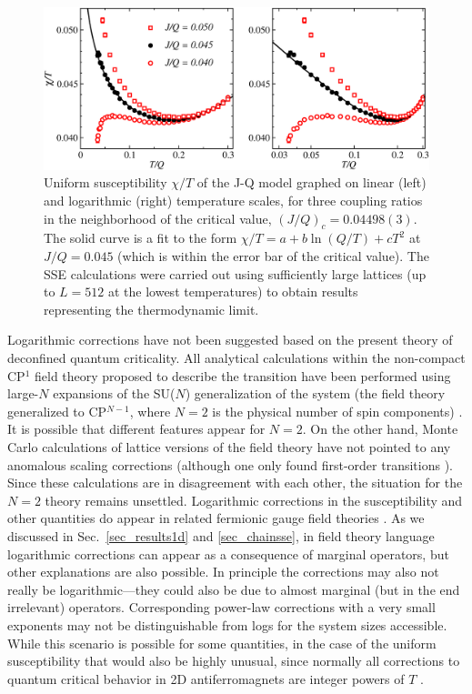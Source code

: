 \documentclass[draft,numberedheadings]{aipproc}
\begin{document}
\begin{figure}
\includegraphics[width=13.5cm, clip]{jqsusc.eps}
\caption{Uniform susceptibility $\chi/T$ of the J-Q model graphed on linear (left) and logarithmic (right) temperature scales, for three coupling ratios 
in the neighborhood of the critical value, $(J/Q)_c = 0.04498(3)$. The solid curve is a fit to the form $\chi/T=a+b\ln(Q/T)+cT^2$ at $J/Q=0.045$
(which is within the error bar of the critical value). The SSE calculations were carried out using sufficiently large lattices (up to $L=512$ 
at the lowest temperatures) to obtain results representing the thermodynamic limit.}
\label{jqsusc}
\end{figure}

Logarithmic corrections have not been suggested based on the present theory of deconfined quantum criticality. All analytical calculations within the 
non-compact CP$^1$ field theory proposed to describe the transition have been performed using large-$N$ expansions of the SU($N$) generalization of the 
system (the field theory generalized to CP$^{N-1}$, where $N=2$ is the physical number of spin components) \cite{senthil1,senthil1,nogueira07}. 
It is possible that different features appear for $N=2$. On the other hand, Monte Carlo calculations of lattice versions of the field theory 
\cite{motrunich04,takashima05,kuklov08} have not pointed to any anomalous scaling corrections (although one only found first-order transitions 
\cite{kuklov08}). Since these calculations are in disagreement with each other, the situation for the $N=2$ theory remains unsettled. Logarithmic 
corrections in the susceptibility and other quantities do appear in related fermionic gauge field theories \cite{kim97}. As we discussed in 
Sec.~\ref{sec_results1d} and \ref{sec_chainsse}, in field theory language logarithmic corrections can appear as a consequence of marginal 
operators, but other explanations are also possible. In principle the corrections may also not really be logarithmic---they could also be due 
to almost marginal (but in the end irrelevant) operators. Corresponding power-law corrections with a very small exponents may not be 
distinguishable from logs for the system sizes accessible. While this scenario is possible for some quantities, in the case of the uniform 
susceptibility that would also be highly unusual, since normally all corrections to quantum critical behavior in 2D antiferromagnets are 
integer powers of $T$ \cite{chubukov}.
\end{document}
